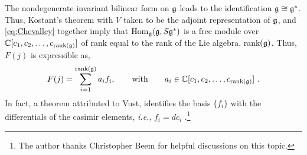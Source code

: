 The nondegenerate invariant bilinear form on $\mathfrak{g}$ leads to the identification $\mathfrak{g} \cong \mathfrak{g}^*$. Thus, Kostant's theorem with $V$ taken to be the adjoint representation of $\mathfrak{g}$, and \eqref{eq:Chevalley} together imply that $\mathrm{Hom}_{\mathfrak{g}}(\mathfrak{g}, S\mathfrak{g}^*)$ is a free module over $\mathbb{C}[c_1, c_2, \ldots, c_{\mathrm{rank}(\mathfrak{g})}]$ of rank equal to the rank of the Lie algebra, rank$(\mathfrak{g})$. Thus, $F(j)$ is expressible as,
\begin{equation} \label{eq:Kostant}
    F(j) = \sum_{i=1}^{\mathrm{rank}(\mathfrak{g})} a_i f_i, \qquad \mathrm{with} \qquad a_i \in \mathbb{C}[c_1, c_2, \ldots, c_{\mathrm{rank}(\mathfrak{g})}]~.
\end{equation}
In fact, a theorem attributed to Vust, identifies the basis $\{f_i\}$ with the differentials of the casimir elements, \emph{i.e.}, $f_i = dc_i$ \cite{Vust1974, PANYUSHEV2002125, panyushev2007semi}.\footnote{The author thanks Christopher Beem for helpful discussions on this topic.}

